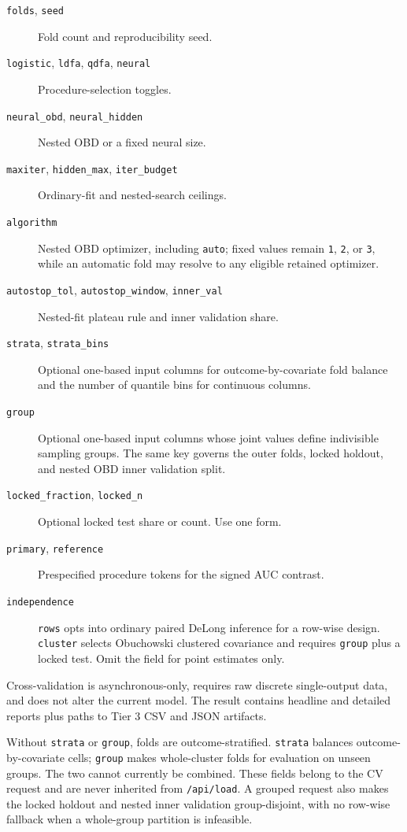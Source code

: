 \begin{description}
\item[\texttt{folds}, \texttt{seed}] Fold count and reproducibility
seed.
\item[\texttt{logistic}, \texttt{ldfa}, \texttt{qdfa},
\texttt{neural}] Procedure-selection toggles.
\item[\texttt{neural\_obd}, \texttt{neural\_hidden}] Nested OBD or a
fixed neural size.
\item[\texttt{maxiter}, \texttt{hidden\_max},
\texttt{iter\_budget}] Ordinary-fit and nested-search ceilings.
\item[\texttt{algorithm}] Nested OBD optimizer, including
\texttt{auto}; fixed values remain \texttt{1}, \texttt{2}, or \texttt{3},
while an automatic fold may resolve to any eligible retained optimizer.
\item[\texttt{autostop\_tol}, \texttt{autostop\_window},
\texttt{inner\_val}] Nested-fit plateau rule and inner validation
share.
\item[\texttt{strata}, \texttt{strata\_bins}] Optional one-based
input columns for outcome-by-covariate fold balance and the number of
quantile bins for continuous columns.
\item[\texttt{group}] Optional one-based input columns whose joint
values define indivisible sampling groups.  The same key governs the
outer folds, locked holdout, and nested OBD inner validation split.
\item[\texttt{locked\_fraction}, \texttt{locked\_n}] Optional locked
test share or count.  Use one form.
\item[\texttt{primary}, \texttt{reference}] Prespecified procedure
tokens for the signed AUC contrast.
\item[\texttt{independence}] \texttt{rows} opts into ordinary paired
DeLong inference for a row-wise design.  \texttt{cluster} selects
Obuchowski clustered covariance and requires \texttt{group} plus a
locked test.  Omit the field for point estimates only.
\end{description}

Cross-validation is asynchronous-only, requires raw discrete
single-output data, and does not alter the current model.  The result
contains headline and detailed reports plus paths to Tier 3 CSV and
JSON artifacts.

Without \texttt{strata} or \texttt{group}, folds are
outcome-stratified.  \texttt{strata} balances outcome-by-covariate
cells; \texttt{group} makes whole-cluster folds for evaluation on
unseen groups.  The two cannot currently be combined.  These fields
belong to the CV request and are never inherited from
\texttt{/api/load}.  A grouped request also makes the locked holdout
and nested inner validation group-disjoint, with no row-wise fallback
when a whole-group partition is infeasible.

